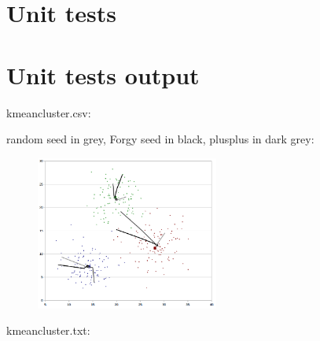 \section{Unit tests}

\begin{scriptsize}
\begin{ttfamily}

\end{ttfamily}
\end{scriptsize}

\section{Unit tests output}

\begin{scriptsize}
\begin{ttfamily}

\end{ttfamily}
\end{scriptsize}

kmeancluster.csv:\\
\begin{scriptsize}
\begin{ttfamily}

\end{ttfamily}
\end{scriptsize}

random seed in grey, Forgy seed in black, plusplus in dark grey:\\
\begin{center}
\begin{figure}[H]
\centering\includegraphics[width=6cm]{./kmeansclustering.png}\\
\end{figure}
\end{center}

kmeancluster.txt:\\
\begin{scriptsize}
\begin{ttfamily}

\end{ttfamily}
\end{scriptsize}

